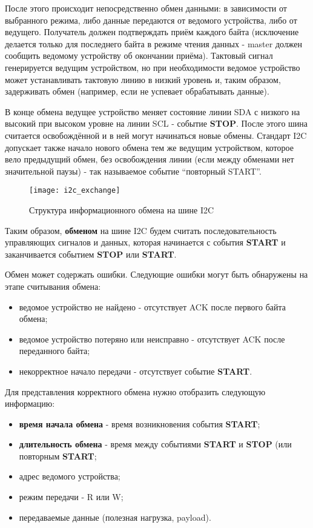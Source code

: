 После этого происходит непосредственно обмен данными: в зависимости от выбранного режима, либо данные передаются от ведомого устройства, либо от ведущего. Получатель должен подтверждать приём каждого байта (исключение делается только для последнего байта в режиме чтения данных - master должен сообщить ведомому устройству об окончании приёма). Тактовый сигнал генерируется ведущим устройством, но при необходимости ведомое устройство может устанавливать тактовую линию в низкий уровень и, таким образом, задерживать обмен (например, если не успевает обрабатывать данные).

В конце обмена ведущее устройство меняет состояние линии SDA с низкого на высокий при высоком уровне на линии SCL - событие \textbf{STOP}. После этого шина считается освобождённой и в ней могут начинаться новые обмены. Стандарт I2C допускает также начало нового обмена тем же ведущим устройством, которое вело предыдущий обмен, без освобождения линии (если между обменами нет значительной паузы) - так называемое событие ``повторный START''.

\begin{figure}[H]
 \centering
 \texttt{[image: i2c\_exchange]}
 \caption{Структура информационного обмена на шине I2C}
 \label{fig:i2c_exchange}
\end{figure}

Таким образом, \textbf{обменом} на шине I2C будем считать последовательность управляющих сигналов и данных, которая начинается с события \textbf{START} и заканчивается событием \textbf{STOP} или \textbf{START}.

Обмен может содержать ошибки. Следующие ошибки могут быть обнаружены на этапе считывания обмена:

\begin{itemize}
 \item ведомое устройство не найдено - отсутствует ACK после первого байта обмена;
 \item ведомое устройство потеряно или неисправно - отсутствует ACK после переданного байта;
 \item некорректное начало передачи - отсутствует событие \textbf{START}.
\end{itemize}


Для представления корректного обмена нужно отобразить следующую информацию:

\begin{itemize}
 \item \textbf{время начала обмена} - время возникновения события \textbf{START};
 \item \textbf{длительность обмена} - время между событиями \textbf{START} и \textbf{STOP} (или повторным \textbf{START};
 \item адрес ведомого устройства;
 \item режим передачи - R или W;
 \item передаваемые данные (полезная нагрузка, payload).
\end{itemize}